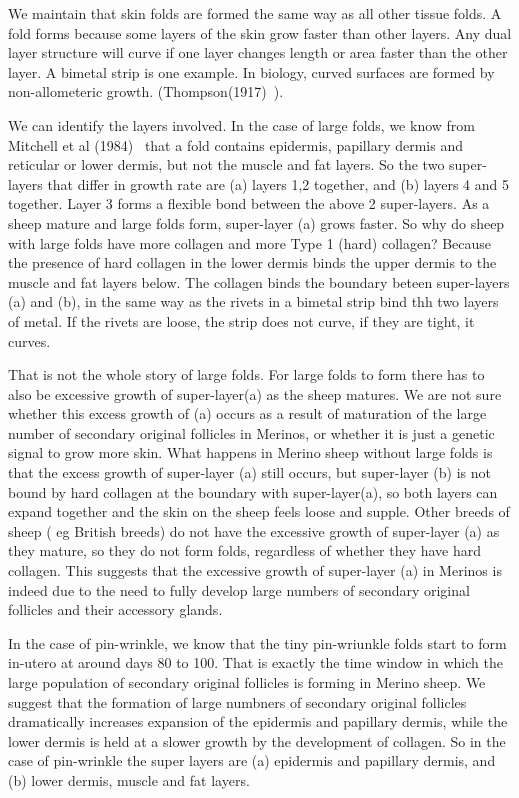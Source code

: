 \documentclass[titlepage]{article}  %
\begin{document}
We maintain that skin folds are formed the same way as all other tissue folds. A fold forms because some layers of the skin grow faster than other layers.  Any dual layer structure will curve if one layer changes length or area faster than the other layer. A bimetal strip is one example. In biology, curved surfaces are formed by non-allometeric growth. (Thompson(1917)~\cite{thom:17}).

We can identify the layers involved. In the case of large folds, we know from Mitchell et al (1984)~\cite{mitc:84} that a fold contains epidermis, papillary dermis and reticular or lower dermis, but not the muscle and fat layers.  So the two super-layers that differ in growth rate are (a) layers 1,2 together, and (b) layers 4 and 5 together. Layer 3 forms a flexible bond between the above 2 super-layers. As a sheep mature and large folds form,  super-layer (a) grows faster.  So why do sheep with large folds have more collagen and more Type 1 (hard) collagen? Because the presence of hard collagen in the lower dermis binds the upper dermis to the muscle and fat layers below.  The collagen binds the boundary beteen super-layers (a) and (b), in the same way as the rivets in a bimetal strip bind thh two layers of metal. If the rivets are loose, the strip does not curve, if they are tight, it curves.

That is not the whole story of large folds. For large folds to form there has to also be excessive growth of super-layer(a) as the sheep matures. We are not sure whether this excess growth of (a) occurs as a result of maturation of the large number of secondary original follicles in Merinos, or whether it is just a genetic signal to grow more skin. What happens in Merino sheep without large folds is that the excess growth of super-layer (a) still occurs, but super-layer (b)  is not bound by hard collagen at the boundary with super-layer(a), so both layers can expand together and the skin on the sheep feels loose and supple. Other breeds of sheep ( eg British breeds) do not have the excessive growth of super-layer (a) as they mature, so they do not form folds, regardless of whether they have hard collagen. This suggests that the excessive growth of super-layer (a) in Merinos is indeed due to the need to fully develop large numbers of secondary original follicles and their accessory glands. 

In the case of pin-wrinkle, we know that the tiny pin-wriunkle folds start to form in-utero at around days 80 to 100. That is exactly the time window in which the large population of secondary original follicles is forming in Merino sheep. We suggest that the formation of large numbners of secondary original follicles dramatically increases expansion of the epidermis and papillary dermis, while the lower dermis is held at a slower growth by the development of collagen. So in the case of pin-wrinkle the super layers are (a) epidermis and papillary dermis, and (b) lower dermis, muscle and fat layers.
\end{document}
